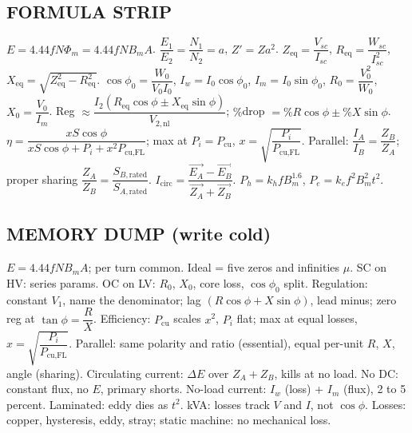 \documentclass[11pt]{article}
\begin{document}
\subsection*{\color{copper}FORMULA STRIP}
$E = 4.44 f N \Phi_m = 4.44 f N B_m A$. $\dfrac{E_1}{E_2} = \dfrac{N_1}{N_2} = a$, $Z' = Z a^{2}$. $Z_{\text{eq}} = \dfrac{V_{sc}}{I_{sc}}$, $R_{\text{eq}} = \dfrac{W_{sc}}{I_{sc}^{2}}$, $X_{\text{eq}} = \sqrt{Z_{\text{eq}}^{2} - R_{\text{eq}}^{2}}$. $\cos\phi_0 = \dfrac{W_0}{V_0 I_0}$, $I_w = I_0 \cos\phi_0$, $I_m = I_0 \sin\phi_0$, $R_0 = \dfrac{V_0^{2}}{W_0}$, $X_0 = \dfrac{V_0}{I_m}$. Reg $\approx \dfrac{I_2 (R_{\text{eq}} \cos\phi \pm X_{\text{eq}} \sin\phi)}{V_{2,\text{nl}}}$; $\%$drop $= \%R \cos\phi \pm \%X \sin\phi$. $\eta = \dfrac{x S \cos\phi}{x S \cos\phi + P_i + x^{2} P_{\text{cu,FL}}}$; max at $P_i = P_{\text{cu}}$, $x = \sqrt{\dfrac{P_i}{P_{\text{cu,FL}}}}$. Parallel: $\dfrac{I_A}{I_B} = \dfrac{Z_B}{Z_A}$; proper sharing $\dfrac{Z_A}{Z_B} = \dfrac{S_{B,\text{rated}}}{S_{A,\text{rated}}}$. $I_{\text{circ}} = \dfrac{\vec{E_A} - \vec{E_B}}{\vec{Z_A} + \vec{Z_B}}$. $P_h = k_h f B_m^{1.6}$, $P_e = k_e f^{2} B_m^{2} t^{2}$.

\subsection*{\color{copper}MEMORY DUMP (write cold)}
$E = 4.44 f N B_m A$; per turn common. Ideal = five zeros and infinities $\mu$. SC on HV: series params. OC on LV: $R_0$, $X_0$, core loss, $\cos\phi_0$ split. Regulation: constant $V_1$, name the denominator; lag $(R\cos\phi + X\sin\phi)$, lead minus; zero reg at $\tan\phi = \dfrac{R}{X}$. Efficiency: $P_{\text{cu}}$ scales $x^{2}$, $P_i$ flat; max at equal losses, $x = \sqrt{\dfrac{P_i}{P_{\text{cu,FL}}}}$. Parallel: same polarity and ratio (essential), equal per-unit $R$, $X$, angle (sharing). Circulating current: $\Delta E$ over $Z_A + Z_B$, kills at no load. No DC: constant flux, no $E$, primary shorts. No-load current: $I_w$ (loss) + $I_m$ (flux), 2 to 5 percent. Laminated: eddy dies as $t^{2}$. kVA: losses track $V$ and $I$, not $\cos\phi$. Losses: copper, hysteresis, eddy, stray; static machine: no mechanical loss.
\end{document}

